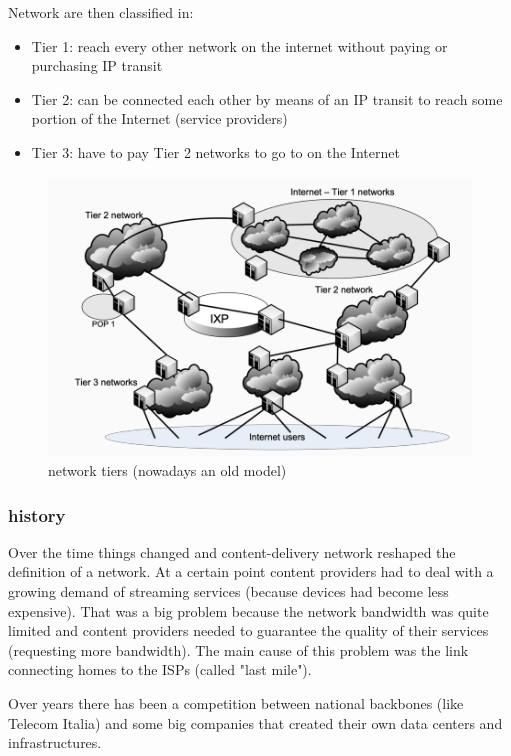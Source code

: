         Network are then classified in:
        \begin{itemize}
            \item Tier 1: reach every other network on the internet without paying or purchasing IP transit
            \item Tier 2: can be connected each other by means of an IP transit to reach some portion of the Internet (service providers)
            \item Tier 3: have to pay Tier 2 networks to go to on the Internet
        \end{itemize}
        \begin{figure}[h!]
            \centering
            \includegraphics[scale=0.6]{images/network tiers.png}
            \caption{network tiers (nowadays an old model)}
            \label{fig:nettiers}
        \end{figure}
        
    \subsubsection{history}
        Over the time things changed and content-delivery network reshaped the definition of a network. At a certain point content providers had to deal with a growing demand of streaming services (because devices had become less expensive). That was a big problem because the network bandwidth was quite limited and content providers needed to guarantee the quality of their services (requesting more bandwidth). The main cause of this problem was the link connecting homes to the ISPs (called "last mile").
        
        Over years there has been a competition between national backbones (like Telecom Italia) and some big companies that created their own data centers and infrastructures.
        
